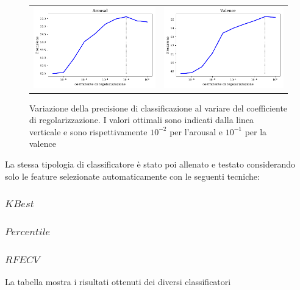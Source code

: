 \begin{figure}
\begin{tabular}{cc}
 \includegraphics[width=.45\textwidth]{img/reg_coef_aro.pdf} & \includegraphics[width=.45\textwidth]{img/reg_coef_val.pdf}
\end{tabular}
\caption{Variazione della precisione di classificazione al variare del coefficiente di regolarizzazione. I valori ottimali sono indicati dalla linea verticale e sono rispettivamente $10^{-2}$ per l'arousal e $10^{-1}$ per la valence}
\label{img:regolarization_test}
\end{figure}


La stessa tipologia di classificatore è stato poi allenato e testato considerando solo le feature selezionate automaticamente con le seguenti tecniche:

\subsubsection{$KBest$}


\subsubsection{$Percentile$}


\subsubsection{$RFECV$}


La tabella \cite{table:feature_selection_table} mostra i risultati ottenuti dei diversi classificatori